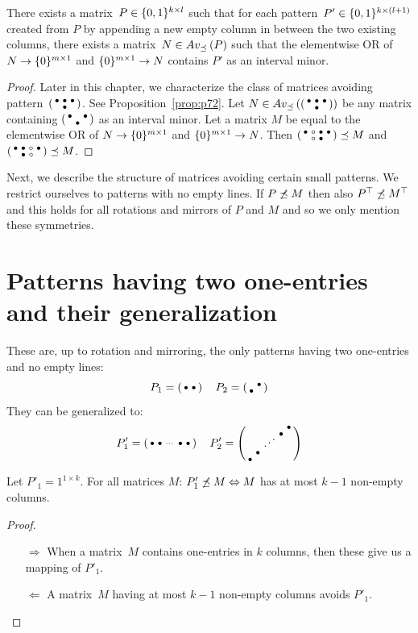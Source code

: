 \begin{prop}
There exists a matrix~$P\in\{0,1\}^{k\times l}$ such that for each pattern~$P'\in\{0,1\}^{k\times(l+1)}$ created from $P$ by appending a new empty column in between the two existing columns, there exists a matrix~$N\in Av_{\preceq}\left(P\right)$ such that the elementwise OR of $N\rightarrow\{0\}^{m\times 1}$ and $\{0\}^{m\times 1}\rightarrow N$ contains $P'$ as an interval minor.
\end{prop}
\begin{proof}
Later in this chapter, we characterize the class of matrices avoiding pattern~$\left(\begin{smallmatrix}\bullet&\bullet&\bullet\\ &\bullet& \end{smallmatrix}\right)$. See Proposition~\ref{prop:p72}. Let $N\in Av_{\preceq}\left(\left(\begin{smallmatrix}\bullet&\bullet&\bullet\\ &\bullet& \end{smallmatrix}\right)\right)$ be any matrix containing $\left(\begin{smallmatrix}\bullet& &\bullet\\ &\bullet& \end{smallmatrix}\right)$ as an interval minor. Let a matrix $M$ be equal to the elementwise OR of $N\rightarrow\{0\}^{m\times 1}$ and $\{0\}^{m\times 1}\rightarrow N$. Then $\left(\begin{smallmatrix}\bullet&\circ&\bullet&\bullet\\ &\circ&\bullet& \end{smallmatrix}\right)\preceq M$ and $\left(\begin{smallmatrix}\bullet&\bullet&\circ&\bullet\\ &\bullet&\circ& \end{smallmatrix}\right)\preceq M$.
\end{proof}

Next, we describe the structure of matrices avoiding certain small patterns. We restrict ourselves to patterns with no empty lines. If $P\not\preceq M$ then also $P^\top\not\preceq M^\top$ and this holds for all rotations and mirrors of $P$ and $M$ and so we only mention these symmetries.

\section{Patterns having two one-entries and their generalization}
\label{sec:2ones}
These are, up to rotation and mirroring, the only patterns having two one-entries and no empty lines:
$$P_1=\smm{\bullet&\bullet}\ \ 
\ P_2=\smm{ &\bullet\\\bullet& }$$
They can be generalized to:
$$P'_1=\smm{\bullet&\bullet&\cdots&\bullet&\bullet}\ \ 
\ P'_2=\smm{ & & & &\bullet\\ & & &\bullet& \\ & &\Ddots& & \\ &\bullet& & & \\\bullet& & & & }$$

\begin{prop}
Let $P'_1=1^{1\times k}$. For all matrices $M$: $P'_1\not\preceq M\Leftrightarrow M$ has at most $k-1$ non-empty columns.
\end{prop}
\begin{proof}
\begin{itemize}
	\item[$\Rightarrow$] When a matrix~$M$ contains one-entries in $k$ columns, then these give us a mapping of $P'_1$.
	\item[$\Leftarrow$] A matrix~$M$ having at most $k-1$ non-empty columns avoids $P'_1$. \qedhere
\end{itemize}
\end{proof}

